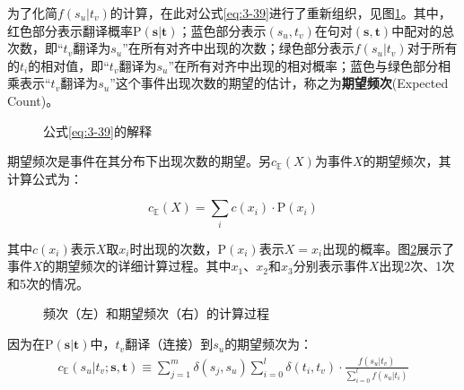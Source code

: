 \noindent \hspace{2em} 为了化简$f(s_u|t_v)$的计算，在此对公式\ref{eq:3-39}进行了重新组织，见图\ref{fig:3-25}。其中，红色部分表示翻译概率P$(\mathbf{s}|\mathbf{t})$；蓝色部分表示$(s_u,t_v)$在句对$(\mathbf{s},\mathbf{t})$中配对的总次数，即``$t_v$翻译为$s_u$''在所有对齐中出现的次数；绿色部分表示$f(s_u|t_v)$对于所有的$t_i$的相对值，即``$t_v$翻译为$s_u$''在所有对齐中出现的相对概率；蓝色与绿色部分相乘表示``$t_v$翻译为$s_u$''这个事件出现次数的期望的估计，称之为{\small\sffamily\bfseries{期望频次}}(Expected Count)。
\vspace{-0.3em}
\begin{figure}[htp]
    \centering

   \caption{公式\ref{eq:3-39}的解释}
   \label{fig:3-25}
\end{figure}

\noindent \hspace{2em} 期望频次是事件在其分布下出现次数的期望。另$c_{\mathbb{E}}(X)$为事件$X$的期望频次，其计算公式为：

\begin{equation}
c_{\mathbb{E}}(X)=\sum_i c(x_i) \cdot \textrm{P}(x_i)
\end{equation}

\noindent 其中$c(x_i)$表示$X$取$x_i$时出现的次数，P$(x_i)$表示$X=x_i$出现的概率。图\ref{fig:3-26}展示了事件$X$的期望频次的详细计算过程。其中$x_1$、$x_2$和$x_3$分别表示事件$X$出现2次、1次和5次的情况。

\begin{figure}[htp]
    \centering
\subfigure{}
\subfigure{}
   \caption{频次（左）和期望频次（右）的计算过程}
   \label{fig:3-26}
\end{figure}

\noindent \hspace{2em} 因为在$\textrm{P}(\mathbf{s}|\mathbf{t})$中，$t_v$翻译（连接）到$s_u$的期望频次为：
\begin{eqnarray}
c_{\mathbb{E}}(s_u|t_v;\mathbf{s},\mathbf{t}) \equiv \sum\limits_{j=1}^{m} \delta(s_j,s_u) \sum\limits_{i=0}^{l} \delta(t_i,t_v) \cdot \frac {f(s_u|t_v)}{\sum\limits_{i=0}^{l}f(s_u|t_i)}
\label{eq:3-40}
\end{eqnarray}


